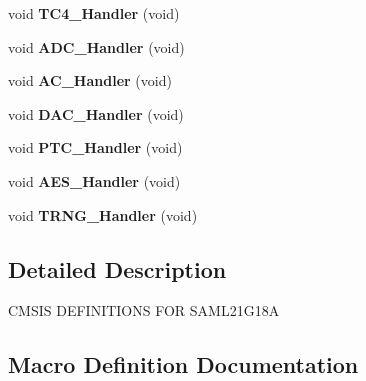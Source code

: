 \begin{DoxyCompactItemize}
\item 
\hypertarget{group___s_a_m_l21_g18_a__cmsis_ga0c1fbde5812fec0be065efcc9d864efd}{}void {\bfseries T\+C4\+\_\+\+Handler} (void)\label{group___s_a_m_l21_g18_a__cmsis_ga0c1fbde5812fec0be065efcc9d864efd}

\item 
\hypertarget{group___s_a_m_l21_g18_a__cmsis_gada953331e0adc056867e918bc80ce8a5}{}void {\bfseries A\+D\+C\+\_\+\+Handler} (void)\label{group___s_a_m_l21_g18_a__cmsis_gada953331e0adc056867e918bc80ce8a5}

\item 
\hypertarget{group___s_a_m_l21_g18_a__cmsis_ga591d634cc8d92aabdba828034e30ec92}{}void {\bfseries A\+C\+\_\+\+Handler} (void)\label{group___s_a_m_l21_g18_a__cmsis_ga591d634cc8d92aabdba828034e30ec92}

\item 
\hypertarget{group___s_a_m_l21_g18_a__cmsis_ga8d4b8614e1c8468e26d48a962c57dc70}{}void {\bfseries D\+A\+C\+\_\+\+Handler} (void)\label{group___s_a_m_l21_g18_a__cmsis_ga8d4b8614e1c8468e26d48a962c57dc70}

\item 
\hypertarget{group___s_a_m_l21_g18_a__cmsis_ga1d86b5af01af9f6a15c23a6406dbc31b}{}void {\bfseries P\+T\+C\+\_\+\+Handler} (void)\label{group___s_a_m_l21_g18_a__cmsis_ga1d86b5af01af9f6a15c23a6406dbc31b}

\item 
\hypertarget{group___s_a_m_l21_g18_a__cmsis_gae1a36480dbaa74ad00783e1bdc5be4f2}{}void {\bfseries A\+E\+S\+\_\+\+Handler} (void)\label{group___s_a_m_l21_g18_a__cmsis_gae1a36480dbaa74ad00783e1bdc5be4f2}

\item 
\hypertarget{group___s_a_m_l21_g18_a__cmsis_ga49bc805925cf23257d81ed4b3a21000d}{}void {\bfseries T\+R\+N\+G\+\_\+\+Handler} (void)\label{group___s_a_m_l21_g18_a__cmsis_ga49bc805925cf23257d81ed4b3a21000d}

\end{DoxyCompactItemize}


\subsection{Detailed Description}
C\+M\+S\+I\+S D\+E\+F\+I\+N\+I\+T\+I\+O\+N\+S F\+O\+R S\+A\+M\+L21\+G18\+A 

\subsection{Macro Definition Documentation}
\hypertarget{group___s_a_m_l21_g18_a__cmsis_ga2b7180ed347a0e902c5765deb46e650e}{}
